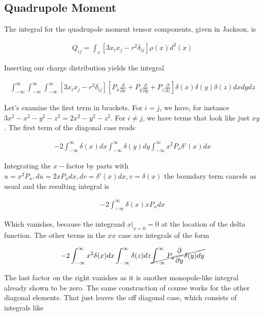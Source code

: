 \documentclass[paper=a4, fontsize=11pt]{scrartcl} %
\newcommand{\partd}[2]{\frac{\partial #1}{\partial #2}}
\numberwithin{equation}{section} %
\numberwithin{figure}{section} %
\numberwithin{table}{section} %
\begin{document}
\subsection{Quadrupole Moment}

The integral for the quadrupole moment tensor components, given in Jackson, is

\begin{align}
Q_{ij} = \int_v \left[3x_ix_j - r^2\delta_{ij}\right]\rho(x)d^3(x)
\end{align}

Inserting our charge distribution yields the integral

\begin{align}
\int_{-\infty}^{\infty}\int_{-\infty}^{\infty}\int_{-\infty}^{\infty}\left[3x_ix_j - r^2 \delta_{ij}\right]\left[P_x\partd{}{x} + P_y\partd{}{y} + P_z\partd{}{z}\right]\delta(x)\delta(y)\delta(z)dxdydz
\end{align}

Let's examine the first term in brackets. For $i=j$, we have, for instance $3x^2 - x^2 - y^2 - z^2 = 2x^2 - y^2 - z^2$. For $i\neq j$, we have terms that look like just $xy$. The first term of the diagonal case reads 

\begin{align}
-2\int_{-\infty}^{\infty}\delta(x)dx\int_{-\infty}^{\infty}\delta(y)dy\int_{-\infty}^{\infty}x^2P_x\delta'(x)dx
\end{align}

Integrating the $x-$factor by parts with $u=x^2P_x, du=2xP_x dx, dv=\delta'(x)dx, v=\delta(x)$ the boundary term cancels as usual and the resulting integral is 

\begin{align}
-2\int_{-\infty}^{\infty} \delta(x)xP_xdx 
\end{align}
 
Which vanishes, because the integrand $x|_{x=0} = 0$ at the location of the delta function. The other terms in the $xx$ case are integrals of the form

\begin{align}
-2\int_{-\infty}^{\infty}x^2\delta(x)dx \int_{-\infty}^{\infty}\delta(z)dz \cancel{\int_{-\infty}^{\infty}P_y\partd{}{y}\delta(y)dy} 
\end{align}

The last factor on the right vanishes as it is another monopole-like integral already shown to be zero. The same construction of course works for the other diagonal elements. That just leaves the off diagonal case, which consists of integrals like
\end{document}
